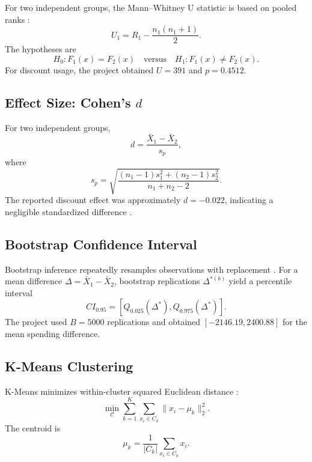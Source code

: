\documentclass[11pt,a4paper]{article}
\begin{document}
For two independent groups, the Mann--Whitney U statistic is based on
pooled ranks \cite{mannwhitney}:
\begin{equation}
U_1=R_1-\frac{n_1(n_1+1)}{2}.
\end{equation}
The hypotheses are
\begin{equation}
H_0:F_1(x)=F_2(x)
\quad\text{versus}\quad
H_1:F_1(x)\neq F_2(x).
\end{equation}
For discount usage, the project obtained $U=391$ and $p=0.4512$.

\subsection{Effect Size: Cohen's $d$}

For two independent groups,
\begin{equation}
d=\frac{\bar X_1-\bar X_2}{s_p},
\end{equation}
where
\begin{equation}
s_p=
\sqrt{
\frac{(n_1-1)s_1^2+(n_2-1)s_2^2}
{n_1+n_2-2}
}.
\end{equation}
The reported discount effect was approximately $d=-0.022$, indicating a
negligible standardized difference \cite{cohen}.

\subsection{Bootstrap Confidence Interval}

Bootstrap inference repeatedly resamples observations with replacement
\cite{efron}. For a mean difference $\Delta=\bar X_1-\bar X_2$,
bootstrap replications $\Delta^{*(b)}$ yield a percentile interval
\begin{equation}
CI_{0.95}=
\left[
Q_{0.025}(\Delta^*),
Q_{0.975}(\Delta^*)
\right].
\end{equation}
The project used $B=5000$ replications and obtained
$[-2146.19,2400.88]$ for the mean spending difference.

\subsection{K-Means Clustering}

K-Means minimizes within-cluster squared Euclidean distance
\cite{kmeans}:
\begin{equation}
\min_{\mathcal C}
\sum_{k=1}^{K}\sum_{x_i\in C_k}
\lVert x_i-\mu_k\rVert_2^2.
\end{equation}
The centroid is
\begin{equation}
\mu_k=
\frac{1}{|C_k|}\sum_{x_i\in C_k}x_i.
\end{equation}
\end{document}
